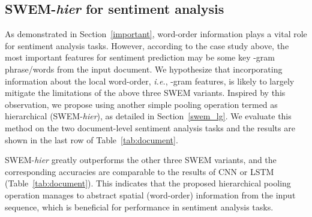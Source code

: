 \documentclass[11pt,a4paper]{article}
\begin{document}
\subsection{SWEM-\emph{hier} for sentiment analysis} \label{LG}
As demonstrated in Section~\ref{important}, word-order information plays a vital role for sentiment analysis tasks.
However, according to the case study above, the most important features for sentiment prediction may be some key -gram phrase/words from the input document.
We hypothesize that incorporating information about the local word-order, \emph{i.e.}, -gram features, is likely to 
largely mitigate the limitations of the above three SWEM variants.
Inspired by this observation, we propose using another simple pooling operation termed as hierarchical (SWEM-\emph{hier}), as detailed in Section~\ref{swem_lg}. 
We evaluate this method on the two document-level sentiment analysis tasks and the results are shown in the last row of Table~\ref{tab:document}.

SWEM-\emph{hier} greatly outperforms the other three SWEM variants, and the corresponding accuracies are comparable to the results of CNN or LSTM (Table~\ref{tab:document}).
This indicates that the proposed hierarchical pooling operation manages to abstract spatial (word-order) information from the input sequence, which is beneficial for performance in sentiment analysis tasks.
\end{document}
